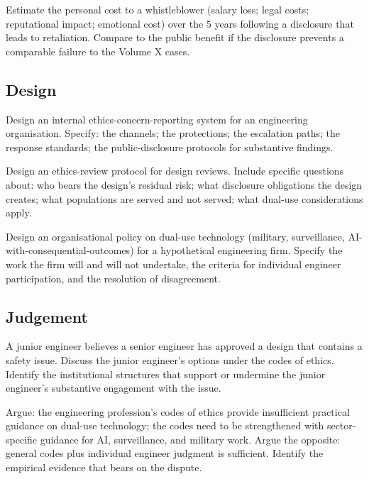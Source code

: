 \begin{exercise}
Estimate the personal cost to a whistleblower (salary loss; legal costs; reputational impact; emotional cost) over the 5 years following a disclosure that leads to retaliation. Compare to the public benefit if the disclosure prevents a comparable failure to the Volume X cases.
\end{exercise}

\subsection*{Design}

\begin{exercise}
Design an internal ethics-concern-reporting system for an engineering organisation. Specify: the channels; the protections; the escalation paths; the response standards; the public-disclosure protocols for substantive findings.
\end{exercise}

\begin{exercise}
Design an ethics-review protocol for design reviews. Include specific questions about: who bears the design's residual risk; what disclosure obligations the design creates; what populations are served and not served; what dual-use considerations apply.
\end{exercise}

\begin{exercise}
Design an organisational policy on dual-use technology (military, surveillance, AI-with-consequential-outcomes) for a hypothetical engineering firm. Specify the work the firm will and will not undertake, the criteria for individual engineer participation, and the resolution of disagreement.
\end{exercise}

\subsection*{Judgement}

\begin{exercise}
A junior engineer believes a senior engineer has approved a design that contains a safety issue. Discuss the junior engineer's options under the codes of ethics. Identify the institutional structures that support or undermine the junior engineer's substantive engagement with the issue.
\end{exercise}

\begin{exercise}
Argue: the engineering profession's codes of ethics provide insufficient practical guidance on dual-use technology; the codes need to be strengthened with sector-specific guidance for AI, surveillance, and military work. Argue the opposite: general codes plus individual engineer judgment is sufficient. Identify the empirical evidence that bears on the dispute.
\end{exercise}

